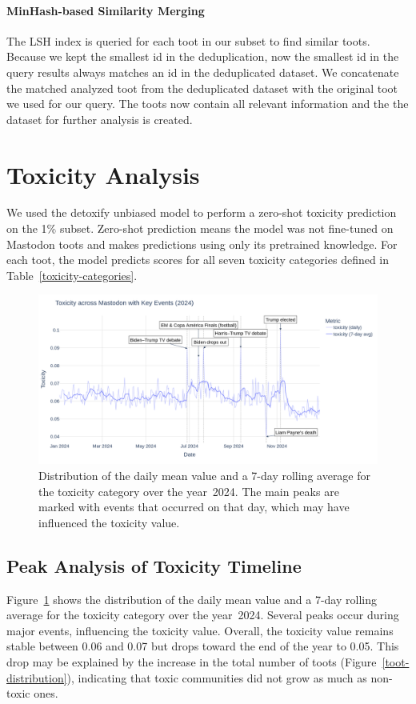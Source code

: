 \paragraph{MinHash-based Similarity Merging}\label{step:merge}
The LSH index is queried for each toot in our subset to find similar toots. Because we kept the smallest id in the deduplication, now the smallest id in the query results always matches an id in the deduplicated dataset. We concatenate the matched analyzed toot from the deduplicated dataset with the original toot we used for our query. The toots now contain all relevant information and the the dataset for further analysis is created.

\section{Toxicity Analysis}\label{step:toxicity}
We used the detoxify unbiased model to perform a zero-shot toxicity prediction on the 1\% subset. Zero-shot prediction means the model was not fine-tuned on Mastodon toots and makes predictions using only its pretrained knowledge. For each toot, the model predicts scores for all seven toxicity categories defined in Table~\ref{toxicity-categories}.

\begin{figure}[tb]
    \centering
    \includegraphics[width=\textwidth]{../material/toxicity_2024.png}
    \caption{Distribution of the daily mean value and a 7-day rolling average for the toxicity category over the year~2024. The main peaks are marked with events that occurred on that day, which may have influenced the toxicity value.}
    \label{toxicity-2024}
\end{figure}

\subsection{Peak Analysis of Toxicity Timeline} 
Figure~\ref{toxicity-2024} shows the distribution of the daily mean value and a 7-day rolling average for the toxicity category over the year~2024. Several peaks occur during major events, influencing the toxicity value. Overall, the toxicity value remains stable between 0.06 and 0.07 but drops toward the end of the year to 0.05. This drop may be explained by the increase in the total number of toots (Figure~\ref{toot-distribution}), indicating that toxic communities did not grow as much as non-toxic ones.

